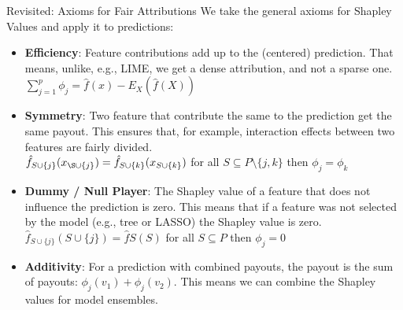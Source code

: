 \documentclass[aspectratio=169]{../latex_main/tntbeamer}  %
\begin{document}
\begin{frame}{Revisited: Axioms for Fair Attributions}
  We take the general axioms for Shapley Values and apply it to predictions:
  \begin{itemize}
    \item \textbf{Efficiency}: Feature contributions add up to the (centered) prediction. That means, unlike, e.g., LIME, we get a dense attribution, and not a sparse one.
      $\sum\nolimits_{j=1}^p\phi_j=\hat{f}(x)-E_X(\hat{f}(X))$
    \item \textbf{Symmetry}: Two feature that contribute the same to the prediction get the same payout. This ensures that, for example, interaction effects between two features are fairly divided. \\
      $\hat{f}_{S\cup\{j\}}(x_{\S \cup \{j\}}) = \hat{f}_{S \cup \{k\}}(x_{S \cup \{k\}})$ for all $S \subseteq P\setminus\{j,k\}$ then $\phi_j=\phi_k$
    \item \textbf{Dummy / Null Player}: The Shapley value of a feature that does not influence the prediction is zero. This means that if a feature was not selected by the model (e.g., tree or LASSO) the Shapley value is zero.  \\
      $\hat{f}_{S \cup \{j\}}(S \cup \{j\})=\hat{f}S(S)$ for all $S \subseteq P$ then $\phi_j=0$
    \item \textbf{Additivity}:  For a prediction with combined payouts, the
      payout is the sum of payouts: $\phi_j(v_1) + \phi_j(v_2)$. This means we can combine the Shapley values for model ensembles.
  \end{itemize}
\end{frame}
\end{document}
